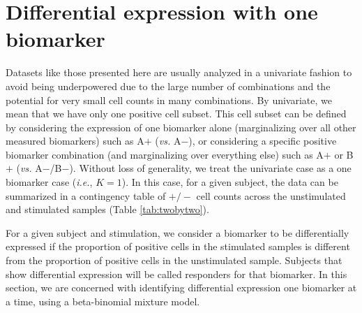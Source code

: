 \documentclass[12pt,oupdraft]{biostatistics}
\begin{document}

\section{Differential expression with one biomarker}
\label{s:DEone}
Datasets like those presented here are usually analyzed in a univariate fashion to avoid being underpowered due to the large number of combinations and the potential for very small cell counts in many combinations. By univariate, we mean that we have only one positive cell subset. This cell subset can be defined by considering the expression of one biomarker alone (marginalizing over all other measured biomarkers) such as A$+$ (\textit{vs.} A$-$), or considering a specific positive biomarker combination (and marginalizing over everything else) such as A$+$ or B$+$ (\textit{vs.} A$-$/B$-$). Without loss of generality, we treat the univariate case as a one biomarker case (\textit{i.e.}, $K=1$). In this case, for a given subject, the data can be summarized in a contingency table of $+/-$ cell counts across the unstimulated and stimulated samples (Table \ref{tab:twobytwo}).

%

For a given subject and stimulation, we consider a biomarker to be differentially expressed if the proportion of positive cells in the stimulated samples is different from the proportion of positive cells in the unstimulated sample. Subjects that show differential expression will be called responders for that biomarker. In this section, we are concerned with identifying differential expression one biomarker at a time, using a beta-binomial mixture model.
\end{document}
